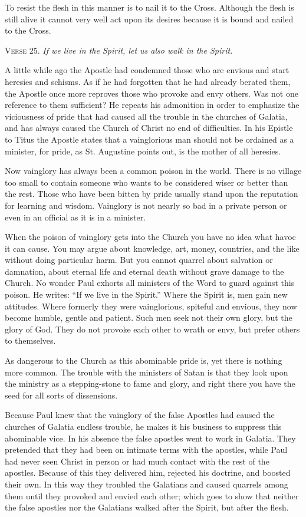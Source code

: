 To resist the flesh in this manner is to nail it to the Cross. Although the flesh is still alive it cannot very well act upon its desires because it is bound and nailed to the Cross.

\textsc{Verse} 25. \emph{If we live in the Spirit, let us also walk in the Spirit.}

A little while ago the Apostle had condemned those who are envious and start heresies and schisms. As if he had forgotten that he had already berated them, the Apostle once more reproves those who provoke and envy others. Was not one reference to them sufficient? He repeats his admonition in order to emphasize the viciousness of pride that had caused all the trouble in the churches of Galatia, and has always caused the Church of Christ no end of difficulties. In his Epistle to Titus the Apostle states that a vainglorious man should not be ordained as a minister, for pride, as St. Augustine points out, is the mother of all heresies.

Now vainglory has always been a common poison in the world. There is no village too small to contain someone who wants to be considered wiser or better than the rest. Those who have been bitten by pride usually stand upon the reputation for learning and wisdom. Vainglory is not nearly so bad in a private person or even in an official as it is in a minister.

When the poison of vainglory gets into the Church you have no idea what havoc it can cause. You may argue about knowledge, art, money, countries, and the like without doing particular harm. But you cannot quarrel about salvation or damnation, about eternal life and eternal death without grave damage to the Church. No wonder Paul exhorts all ministers of the Word to guard against this poison. He writes: “If we live in the Spirit.” Where the Spirit is, men gain new attitudes. Where formerly they were vainglorious, spiteful and envious, they now become humble, gentle and patient. Such men seek not their own glory, but the glory of God. They do not provoke each other to wrath or envy, but prefer others to themselves.

As dangerous to the Church as this abominable pride is, yet there is nothing more common. The trouble with the ministers of Satan is that they look upon the ministry as a stepping-stone to fame and glory, and right there you have the seed for all sorts of dissensions.

Because Paul knew that the vainglory of the false Apostles had caused the churches of Galatia endless trouble, he makes it his business to suppress this abominable vice. In his absence the false apostles went to work in Galatia. They pretended that they had been on intimate terms with the apostles, while Paul had never seen Christ in person or had much contact with the rest of the apostles. Because of this they delivered him, rejected his doctrine, and boosted their own. In this way they troubled the Galatians and caused quarrels among them until they provoked and envied each other; which goes to show that neither the false apostles nor the Galatians walked after the Spirit, but after the flesh.

